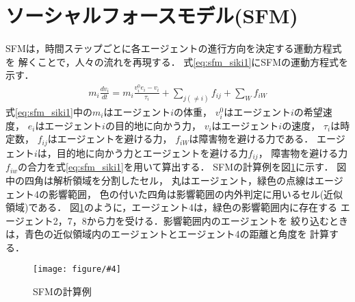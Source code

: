 \documentclass{maelab_y}
\newcommand{\figtb}[5]{ %
\begin{figure}[hbtp]
  \begin{center}
    \texttt{[image: figure/\#4]}
    \caption{#1}
    \label{fig:#5}
  \end{center}
\end{figure}
}%
\newcommand{\分類条件}{%
\begin{table}[t]
\begin{center}
\caption{進行方向を分類する条件}
\ecaption{Classification condition of moving direction $e_{i}$.}
\label{tb:hantei_jouken}
\begin{tabular}{c|c|c|c|c}
\hline \hline
			& 右 & 左 & 上 & 下 \\ \hline
パターン2   & $\frac{1}{\sqrt{2}} < e_x \leq 1  $
		    & $ -1 \leq e_x < \frac{-1}{\sqrt{2}}$ 
		    & $ \frac{-1}{\sqrt{2}} < e_x < \frac{1}{\sqrt{2}} $ 
		    & $ \frac{-1}{2} < e_x < \frac{1}{2} $ \\
パターン3   & $\frac{-1}{2} < e_y < \frac{1}{2} $ 
		    & $\frac{-1}{2} < e_y < \frac{1}{2} $
            & $ \frac{1}{\sqrt{2}} < e_y \leq 1$
		    & $ -1 \leq e_y < \frac{-1}{\sqrt{2}} $ \\
\hline
\multirow{2}{*}{パターン4}   
			& $R_x \geq A_x$ & $R_x < A_x$ & $R_y \geq A_y$ & $R_y < A_y $ \\
	        &  $L_x \geq A_x$ & $L_x < A_x$ & $L_y \geq A_y$ & $L_y < A_y$ \\
\hline
\multirow{2}{*}{パターン5}   
 			& $R_x \geq x_1$ & $R_x < x_2$ & $R_y \geq y_1$ & $R_y < y_2 $ \\
			& $L_x \geq x_1$ & $L_x < x_2$ & $L_y \geq y_1$ & $L_y < y_2 $ \\
\hline
パターン6   & $ \cos(\frac{1}{2}\theta_{view}) \leq  e_y $ 
			& $ e_y \leq -\cos(\frac{1}{2}\theta_{view})$ 
			& $ \sin(\frac{1}{2}(\pi - \theta_{view})) \leq e_x $ 
			& $ e_x \leq \sin(\frac{1}{2}(\pi - \theta_{view}))  $ \\
\hline
\end{tabular}
\end{center}
\end{table}
}%
\newcommand{\距離計算new}{%
  \begin{table}[hbtp]
    \begin{center}
    \caption{エージェント間距離の計算回数[$10^{10}$回]}
    \label{tab:keisan_kaisu}
    \begin{tabular}{c|llllll}
    \hline \hline
    \multirow{2}{*}{人数}   & \multicolumn{6}{c}{パターン}                                                                                                                                                             \\ \cline{2-7} 
                          & \multicolumn{1}{c|}{1}    & \multicolumn{1}{c|}{2}               & \multicolumn{1}{c|}{3}      & \multicolumn{1}{c|}{4}      & \multicolumn{1}{c|}{5}      & \multicolumn{1}{c}{6}    \\ \hline
    \multirow{2}{*}{3000} & \multicolumn{1}{r|}{5.1}  & \multicolumn{1}{r|}{\textbf{3.9}}    & \multicolumn{1}{r|}{4.0}    & \multicolumn{1}{r|}{4.4}    & \multicolumn{1}{r|}{4.1}    & \multicolumn{1}{r}{4.4}  \\
                          & \multicolumn{1}{l|}{}     & \multicolumn{1}{l|}{\textbf{(24\%)}} & \multicolumn{1}{l|}{(23\%)} & \multicolumn{1}{l|}{(15\%)} & \multicolumn{1}{l|}{(21\%)} & (15\%)                   \\ \hline
    \multirow{2}{*}{5000} & \multicolumn{1}{r|}{14.4} & \multicolumn{1}{r|}{\textbf{10.9}}   & \multicolumn{1}{r|}{11.1}   & \multicolumn{1}{r|}{12.2}   & \multicolumn{1}{r|}{11.4}   & \multicolumn{1}{r}{12.2} \\
                          & \multicolumn{1}{l|}{}     & \multicolumn{1}{l|}{\textbf{(24\%)}} & \multicolumn{1}{l|}{(23\%)} & \multicolumn{1}{l|}{(15\%)} & \multicolumn{1}{l|}{(21\%)} & (15\%)                   \\ \hline
    \multirow{2}{*}{7500} & \multicolumn{1}{r|}{33.1} & \multicolumn{1}{r|}{\textbf{25.2}}   & \multicolumn{1}{r|}{25.8}   & \multicolumn{1}{r|}{28.3}   & \multicolumn{1}{r|}{26.7}   & \multicolumn{1}{r}{28.3} \\
                          & \multicolumn{1}{l|}{}     & \multicolumn{1}{l|}{\textbf{(24\%)}} & \multicolumn{1}{l|}{(22\%)} & \multicolumn{1}{l|}{(15\%)} & \multicolumn{1}{l|}{(20\%)} & (15\%)                   \\ \hline
    \end{tabular}
    \end{center}
    \end{table}
}%
\newcommand{\粒子数}{%
\begin{table}[hbtp]
  \begin{center}
    \caption{各配置の詳細}
    \label{tb:haichi_para}
    \begin{tabular}{c|c|c}
      \hline \hline
      & 教室 & 演習室 \\ \hline 
      エージェント数[人] & 96 & 204 \\ \hline
      壁粒子数[個] & 1037 & 1454\\ \hline
      経由地数[個] & 12   & 26 \\ \hline
      解析領域 & $50m\times50m$ & $50m\times50m$ \\ \hline
    \end{tabular}
  \end{center}
\end{table}
}%
\newcommand{\評価環境}{%
\begin{table}[hbtp]
  \begin{center}
    \caption{各配置の詳細}
    \label{tb:haichi_para}
    \begin{tabular}{c|c|c}
      \hline \hline
                 & マシン1                & マシン2 \\ \hline 
      CPU        & Intel Xeon E5-2687W & Intel Xeon E5-2667W \\ \hline
      メモリ     & 64GB                   & 64GB \\ \hline
      OS         & Linux 4.12.9            & Linux 6.5.8 \\ \hline
      コンパイラ & gcc 7.2.0             & gcc 13.2.0 \\ \hline
    \end{tabular}
  \end{center}
\end{table}
}%
\newcommand{\判定条件new}{%
  \begin{table}[hbtp]
    \centering
		\caption{パターンごとの進行方向分類条件}
		\label{tb:joken}
		{\scriptsize
    \begin{tabular}{Wc{0.5em}|cccWc{8em}}
    \hline \hline
                          & \multicolumn{1}{c|}{パターン2，3} & \multicolumn{1}{c|}{パターン4}   & \multicolumn{1}{c|}{パターン5}   & パターン6                   \\ \hline
    \multirow{2}{*}{右}    & \multicolumn{1}{c|}{$\frac{1}{\sqrt{2}} < e_x \leq 1$}  & \multicolumn{1}{c|}{$R_x \geq A_x$}  & \multicolumn{1}{c|}{$R_x \geq x_1$}  & \multirow{2}{*}{$ \cos(\frac{1}{2}\theta_v) \leq  e_y $} \\
                          & \multicolumn{1}{c|}{$\frac{-1}{2} < e_y < \frac{1}{2} $}   & \multicolumn{1}{l|}{$L_x \geq A_x$} & \multicolumn{1}{l|}{$L_x \geq x_1$} &                     \\ \hline
    \multirow{2}{*}{左}    & \multicolumn{1}{c|}{$ -1 \leq e_x < \frac{-1}{\sqrt{2}}$}  & \multicolumn{1}{c|}{$R_x < A_x$}  & \multicolumn{1}{c|}{$R_x < x_2$}  & \multirow{2}{*}{$ e_y \leq -\cos(\frac{1}{2}\theta_{v})$} \\
                          & \multicolumn{1}{l|}{$\frac{-1}{2} < e_y < \frac{1}{2} $}   & \multicolumn{1}{l|}{$L_x < A_x$} & \multicolumn{1}{l|}{$L_x < x_2$ } &                     \\ \hline
    \multirow{2}{*}{上}    & \multicolumn{1}{c|}{$ \frac{-1}{\sqrt{2}} < e_x < \frac{1}{\sqrt{2}}$}  & \multicolumn{1}{c|}{$R_y \geq A_y$ }  & \multicolumn{1}{c|}{$R_y \geq y_1$ }  & \multirow{2}{*}{$ \sin(\frac{1}{2}(\theta_{\pi - v})) \leq e_x$} \\
                          & \multicolumn{1}{l|}{$ \frac{1}{\sqrt{2}} < e_y \leq 1$}   & \multicolumn{1}{l|}{$L_y \geq A_y$} & \multicolumn{1}{l|}{$L_y \geq y_1$} &                     \\ \hline
    \multirow{2}{*}{下}    & \multicolumn{1}{c|}{$ \frac{-1}{2} < e_x < \frac{1}{2} $}  & \multicolumn{1}{c|}{$R_y < A_y $}  & \multicolumn{1}{c|}{$R_y < y_2 $ }  & \multirow{2}{*}{$ e_x \leq \sin(\frac{1}{2}(\theta_{\pi - v}))$} \\
                          & \multicolumn{1}{l|}{$ -1 \leq e_y < \frac{-1}{\sqrt{2}} $}   & \multicolumn{1}{l|}{$L_y < A_y$} & \multicolumn{1}{l|}{$L_y < y_2 $ } &                     \\ \hline
    \end{tabular}
		}
    \end{table}
}%
\begin{document}
\section{ソーシャルフォースモデル(SFM)}
SFMは，時間ステップごとに各エージェントの進行方向を決定する運動方程式を
解くことで，人々の流れを再現する．
式\eqref{eq:sfm_siki1}にSFMの運動方程式を示す．
%
\begin{align} \label{eq:sfm_siki1}
  m_i \frac{dv_i}{dt} = m_i \frac{v_i^0 e_i - v_i}{\tau_i}
  +\sum_{j(\neq i)}f_{ij}+\sum_{W}f_{iW}
\end{align}
%
式\eqref{eq:sfm_siki1}中の$m_i$はエージェント$i$の体重，
$v_i^0$はエージェント$i$の希望速度，
$e_i$はエージェント$i$の目的地に向かう力，
$v_i$はエージェント$i$の速度，
$\tau_i$は時定数，
$f_{ij}$はエージェントを避ける力，
$f_{iW}$は障害物を避ける力である．
エージェント$i$は，目的地に向かう力とエージェントを避ける力$f_{ij}$，
障害物を避ける力$f_{iw}$の合力を式\eqref{eq:sfm_siki1}を用いて算出する．
SFMの計算例を図\ref{fig:sfm_ex}に示す．
図中の四角は解析領域を分割したセル，
丸はエージェント，緑色の点線はエージェント4の影響範囲，
色の付いた四角は影響範囲の内外判定に用いるセル(近似領域)である．
図\ref{fig:sfm_ex}のように，エージェント4は，緑色の影響範囲内に存在する
エージェント2，7，8から力を受ける．影響範囲内のエージェントを
絞り込むときは，青色の近似領域内のエージェントとエージェント4の距離と角度を
計算する．

\figtb{SFMの計算例}{}{8}{20231226_sfm_ex.eps}{sfm_ex}
\end{document}
